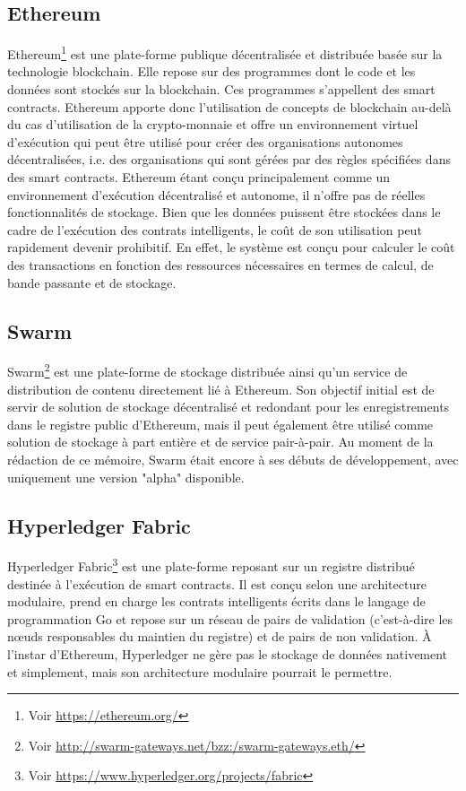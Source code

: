 \documentclass{tnreport}
\begin{document}
\subsection{Ethereum}
\label{sec:ethereum}

Ethereum\footnote{Voir \url{https://ethereum.org/}} est une plate-forme publique décentralisée et distribuée basée sur la technologie blockchain. Elle repose sur des programmes dont le code et les données sont stockés sur la blockchain. Ces programmes s'appellent des smart contracts. 
Ethereum apporte donc l'utilisation de concepts de blockchain au-delà du cas d'utilisation de la crypto-monnaie et offre un environnement virtuel d'exécution qui peut être utilisé pour créer des organisations autonomes décentralisées, i.e. des organisations qui sont gérées par des règles spécifiées dans des smart contracts. Ethereum étant conçu principalement comme un environnement d'exécution décentralisé et autonome, il n'offre pas de réelles fonctionnalités de stockage. Bien que les données puissent être stockées dans le cadre de l'exécution des contrats intelligents, le coût de son utilisation peut rapidement devenir prohibitif. En effet, le système est conçu pour calculer le coût des transactions en fonction des ressources nécessaires en termes de calcul, de bande passante et de stockage.

\subsection{Swarm}

Swarm\footnote{Voir \url{http://swarm-gateways.net/bzz:/swarm-gateways.eth/}} est une plate-forme de stockage distribuée ainsi qu'un service de distribution de contenu directement lié à Ethereum. Son objectif initial est de servir de solution de stockage décentralisé et redondant pour les enregistrements dans le registre public d'Ethereum, mais il peut également être utilisé comme solution de stockage à part entière et de service pair-à-pair. Au moment de la rédaction de ce mémoire, Swarm était encore à ses débuts de développement, avec uniquement une version "alpha" disponible.

\subsection{Hyperledger Fabric}

Hyperledger Fabric\footnote{Voir \url{https://www.hyperledger.org/projects/fabric}} est une plate-forme reposant sur un registre distribué destinée à l'exécution de smart contracts. Il est conçu selon une architecture modulaire, prend en charge les contrats intelligents écrits dans le langage de programmation Go et repose sur un réseau de pairs de validation (c'est-à-dire les nœuds responsables du maintien du registre) et de pairs de non validation. À l'instar d'Ethereum, Hyperledger ne gère pas le stockage de données nativement et simplement, mais son architecture modulaire pourrait le permettre.
\end{document}
